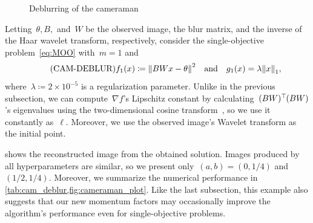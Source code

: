\documentclass[../main]{subfiles}
\begin{document}
\begin{figure}[htpb]
\begin{minipage}[b]{.45\hsize}
        \label{fig:cameraman:blurred_and_noisy}
    \end{minipage}
    \caption{Deblurring of the cameraman}
    \label{fig:cameraman}
\end{figure}

Letting~$\theta, B,$ and~$W$ be the observed image, the blur matrix, and the inverse of the Haar wavelet transform, respectively, consider the single-objective problem~\cref{eq:MOO} with~$m = 1$ and
\[ \label{eq:cam_deblur} \tag{CAM-DEBLUR}
    f_1(x) \coloneqq \norm*{BWx - \theta}^2 \eqand g_1(x)=\lambda \norm*{x}_1
,\] 
where~$\lambda \coloneqq 2 \times 10^{-5}$ is a regularization parameter.
Unlike in the previous subsection, we can compute~$\nabla f$'s Lipschitz constant by calculating~$(BW)^\top\hspace{-1pt}(BW)$'s eigenvalues using the two-dimensional cosine transform~\cite{Hansen2006}, so we use it constantly as~$\ell$.
Moreover, we use the observed image's Wavelet transform as the initial point.

 shows the reconstructed image from the obtained solution.
Images produced by all hyperparameters are similar, so we present only~$(a, b) = (0, 1 / 4)$ and~$(1 / 2, 1 / 4)$.
Moreover, we summarize the numerical performance in \cref{tab:cam_deblur,fig:cameraman_plot}.
Like the last subsection, this example also suggests that our new momentum factors may occasionally improve the algorithm's performance even for single-objective problems.
\end{document}
